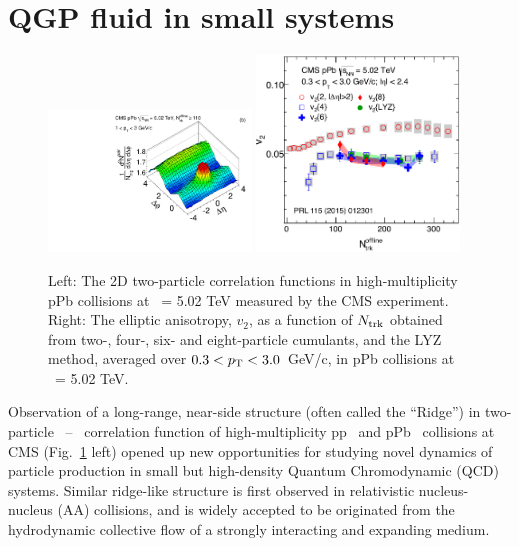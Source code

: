 \section{QGP fluid in small systems}

\begin{figure}[thb]
  \begin{center}
    \includegraphics[width=0.48\textwidth]{figures/corr2D_pPb_N110_pt1-3_20121016.pdf}
    \includegraphics[width=0.48\textwidth]{figures/v2m_pPb.pdf}
    \caption{ Left: The 2D two-particle correlation functions in high-multiplicity 
    pPb collisions at \rootsNN\ = 5.02 TeV measured by the CMS experiment.
    Right: The elliptic anisotropy, $v_2$, as a function of $N_{\rm trk}$
    obtained from two-, four-, six- and eight-particle cumulants, and the LYZ method, 
    averaged over $0.3<p_\mathrm{T}<3.0$~GeV/c, in pPb collisions at \rootsNN\ = 5.02 TeV.
    }
    \label{fig:ridge_pPb}
  \end{center}
\end{figure} 

Observation of a long-range, near-side structure (often called the ``Ridge'') in two-particle
\deta\ -- \dphi\ correlation function of high-multiplicity pp~\cite{Khachatryan:2010gv} 
and pPb~\cite{CMS:2012qk} collisions at CMS (Fig.~\ref{fig:ridge_pPb} left)
opened up new opportunities for studying novel dynamics of particle production 
in small but high-density Quantum Chromodynamic (QCD) systems. Similar ridge-like structure is
first observed in relativistic nucleus-nucleus (AA) collisions, and is widely accepted 
to be originated from the hydrodynamic collective flow of a strongly interacting and 
expanding medium. 

